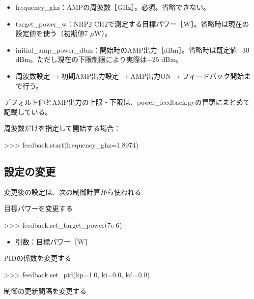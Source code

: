 \documentclass[a4paper,11pt]{ltjsarticle}
\begin{document}
\begin{itemize}

\item frequency\_ghz：AMPの周波数［GHz］。必須。省略できない。

\item target\_power\_w：NRP2 CH2で測定する目標パワー［W］。省略時は現在の設定値を使う（初期値7 $\mu$W）。

\item initial\_amp\_power\_dbm：開始時のAMP出力［dBm］。省略時は既定値$-30$ dBm。ただし現在の下限制限により実際は$-25$ dBm。

\item 周波数設定 → 初期AMP出力設定 → AMP出力ON → フィードバック開始まで行う。

\end{itemize}

デフォルト値とAMP出力の上限・下限は、power\_feedback.pyの冒頭にまとめて記載している。

周波数だけを指定して開始する場合：

\begin{command}
>>> feedback.start(frequency_ghz=1.8974)
\end{command}

\subsection{設定の変更}

変更後の設定は、次の制御計算から使われる


目標パワーを変更する


\begin{command}

>>> feedback.set_target_power(7e-6)

\end{command}

\begin{itemize}

\item 引数：目標パワー［W］

\end{itemize}

PIDの係数を変更する


\begin{command}

>>> feedback.set_pid(kp=1.0, ki=0.0, kd=0.0)

\end{command}

制御の更新間隔を変更する
\end{document}
